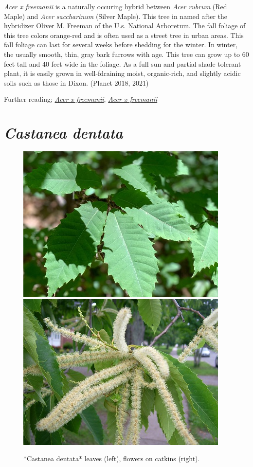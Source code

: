 \documentclass[
]{article}
\begin{document}
\emph{Acer x freemanii} is a naturally occuring hybrid between \emph{Acer rubrum} (Red Maple) and \emph{Acer saccharinum} (Silver Maple). This tree in named after the hybridizer Oliver M. Freeman of the U.s. National Arboretum. The fall foliage of this tree colors orange-red and is often used as a street tree in urban areas. This fall foliage can last for several weeks before shedding for the winter. In winter, the usually smooth, thin, gray bark furrows with age. This tree can grow up to 60 feet tall and 40 feet wide in the foliage. As a full sun and partial shade tolerant plant, it is easily grown in well-fdraining moist, organic-rich, and slightly acidic soils such as those in Dixon. (Planet 2018, 2021)

Further reading; \href{https://plants.ces.ncsu.edu/plants/acer-x-freemanii/}{\emph{Acer x freemanii}}, \href{https://en.wikipedia.org/w/index.php?title=Acer_\%C3\%97_freemanii\&oldid=1049718728}{\emph{Acer x freemanii}}

\hypertarget{castanea-dentata}{%
\section{\texorpdfstring{\emph{Castanea dentata}}{Castanea dentata}}\label{castanea-dentata}}

\begin{figure}

{\centering \includegraphics[width=0.5\linewidth]{castden} \includegraphics[width=0.5\linewidth]{castflower} 

}

\caption{*Castanea dentata* leaves (left), flowers on catkins (right).}\label{fig:cast}
\end{figure}
\end{document}
